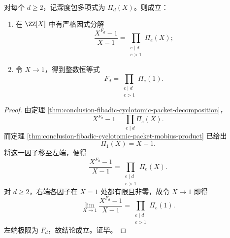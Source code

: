 \begin{theorem}[深度包在 \texorpdfstring{$X=1$}{X=1} 处的 primitive 分解与 Fibonacci 乘法拆分]\label{thm:conclusion-fibadic-depth-packet-primitive-factorization}
对每个 \(d\ge 2\)，记深度包多项式为 \(\Pi_d(X)\)。则成立：
\begin{enumerate}
  \item 在 \(\ZZ[X]\) 中有严格因式分解
  \[
  \frac{X^{F_d}-1}{X-1}
  =
  \prod_{\substack{e\mid d\\ e>1}}\Pi_e(X);
  \]
  \item 令 \(X\to 1\)，得到整数恒等式
  \[
  F_d=\prod_{\substack{e\mid d\\ e>1}}\Pi_e(1).
  \]
\end{enumerate}
\end{theorem}
\begin{proof}
由定理 \ref{thm:conclusion-fibadic-cyclotomic-packet-decomposition}，
\[
X^{F_d}-1=\prod_{e\mid d}\Pi_e(X).
\]
而定理 \ref{thm:conclusion-fibadic-cyclotomic-packet-mobius-product} 已给出
\[
\Pi_1(X)=X-1.
\]
将这一因子移至左端，便得
\[
\frac{X^{F_d}-1}{X-1}
=
\prod_{\substack{e\mid d\\ e>1}}\Pi_e(X).
\]
对 \(d\ge 2\)，右端各因子在 \(X=1\) 处都有限且非零，故令 \(X\to 1\) 即得
\[
\lim_{X\to 1}\frac{X^{F_d}-1}{X-1}
=
\prod_{\substack{e\mid d\\ e>1}}\Pi_e(1).
\]
左端极限为 \(F_d\)，故结论成立。证毕。
\end{proof}

